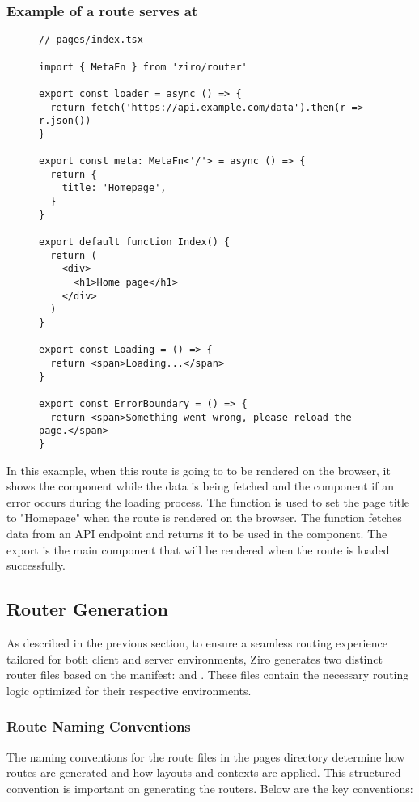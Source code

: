 \subsubsection{Example of a route serves at \cc{/}}
\begin{figure}[H]
\begin{verbatim}
// pages/index.tsx

import { MetaFn } from 'ziro/router'

export const loader = async () => {
  return fetch('https://api.example.com/data').then(r => r.json())
}

export const meta: MetaFn<'/'> = async () => {
  return {
    title: 'Homepage',
  }
}

export default function Index() {
  return (
    <div>
      <h1>Home page</h1>
    </div>
  )
}

export const Loading = () => {
  return <span>Loading...</span>
}

export const ErrorBoundary = () => {
  return <span>Something went wrong, please reload the page.</span>
}
\end{verbatim}
\end{figure}
In this example, when this route is going to to be rendered on the browser, it shows the  component while the data is being fetched and the  component if an error occurs during the loading process. The  function is used to set the page title to "Homepage" when the route is rendered on the browser. The  function fetches data from an API endpoint and returns it to be used in the component. The  export is the main component that will be rendered when the route is loaded successfully.
\pagebreak

\subsection{Router Generation}

As described in the previous section, to ensure a seamless routing experience tailored for both client and server environments, Ziro generates two distinct router files based on the manifest:  and . These files contain the necessary routing logic optimized for their respective environments.

\subsubsection{Route Naming Conventions}
The naming conventions for the route files in the pages directory determine how routes are generated and how layouts and contexts are applied. This structured convention is important on generating the routers. Below are the key conventions:


